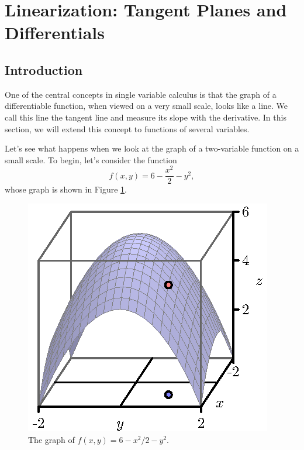 \section{Linearization: Tangent Planes and Differentials} \label{S:10.4.Linearization}

\vspace*{-14 pt}

\subsection*{Introduction}

One of the central concepts in single variable calculus is that the
graph of a differentiable function, when viewed on a very small scale, looks like a
line.  We call this line the tangent line and measure its slope with
the derivative.  In this section, we will extend this concept to
functions of several variables.

Let's see what happens when we look
at the graph of a two-variable function on a small scale.  To begin, let's consider the function
$$ 
f(x,y) = 6 - \frac{x^2}2 - y^2,
$$
whose graph is shown in Figure \ref{F:10.4.tangent.1}.

\begin{figure}[ht]
  \begin{center}
    \includegraphics{figures/fig_10_4_tangent_1.eps}
  \end{center}
  \caption{The graph of $f(x,y)=6-x^2/2 - y^2$.}
  \label{F:10.4.tangent.1}
\end{figure}

